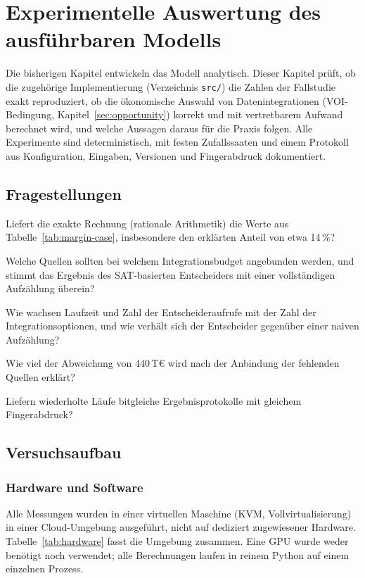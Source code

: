 \documentclass[a4paper,12pt,twoside]{report}
\theoremstyle{definition}
\begin{document}
\chapter{Experimentelle Auswertung des ausführbaren Modells}
\label{sec:experiment}

Die bisherigen Kapitel entwickeln das Modell analytisch. Dieser Kapitel prüft, ob die zugehörige Implementierung (Verzeichnis \texttt{src/}) die Zahlen der Fallstudie exakt reproduziert, ob die ökonomische Auswahl von Datenintegrationen (VOI-Bedingung, Kapitel~\ref{sec:opportunity}) korrekt und mit vertretbarem Aufwand berechnet wird, und welche Aussagen daraus für die Praxis folgen. Alle Experimente sind deterministisch, mit festen Zufallssaaten und einem Protokoll aus Konfiguration, Eingaben, Versionen und Fingerabdruck dokumentiert.

\section{Fragestellungen}
\begin{description}[style=nextline]
\item[E1 -- Reproduktion der Fallstudie.] Liefert die exakte Rechnung (rationale Arithmetik) die Werte aus Tabelle~\ref{tab:margin-case}, insbesondere den erklärten Anteil von etwa 14\,\%?
\item[E2 -- Budgetabhängigkeit der Integrationsauswahl.] Welche Quellen sollten bei welchem Integrationsbudget angebunden werden, und stimmt das Ergebnis des SAT-basierten Entscheiders mit einer vollständigen Aufzählung überein?
\item[E3 -- Skalierung.] Wie wachsen Laufzeit und Zahl der Entscheideraufrufe mit der Zahl der Integrationsoptionen, und wie verhält sich der Entscheider gegenüber einer naiven Aufzählung?
\item[E4 -- Erklärter Anteil bei schrittweiser Integration.] Wie viel der Abweichung von 440\,T€ wird nach der Anbindung der fehlenden Quellen erklärt?
\item[E5 -- Reproduzierbarkeit.] Liefern wiederholte Läufe bitgleiche Ergebnisprotokolle mit gleichem Fingerabdruck?
\end{description}

\section{Versuchsaufbau}
\subsection{Hardware und Software}
Alle Messungen wurden in einer virtuellen Maschine (KVM, Vollvirtualisierung) in einer Cloud-Umgebung ausgeführt, nicht auf dediziert zugewiesener Hardware. Tabelle~\ref{tab:hardware} fasst die Umgebung zusammen. Eine GPU wurde weder benötigt noch verwendet; alle Berechnungen laufen in reinem Python auf einem einzelnen Prozess.
\end{document}
